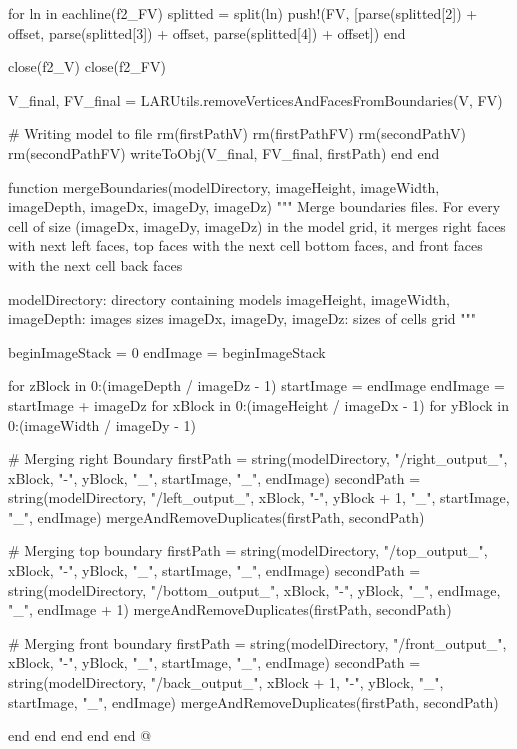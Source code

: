 \documentclass[11pt,oneside]{article}	%
\begin{document}
{    for ln in eachline(f2_FV)
      splitted = split(ln)
      push!(FV, [parse(splitted[2]) + offset, parse(splitted[3]) + offset, parse(splitted[4]) + offset])
    end

    close(f2_V)
    close(f2_FV)
    
    V_final, FV_final = LARUtils.removeVerticesAndFacesFromBoundaries(V, FV)
    
    # Writing model to file
    rm(firstPathV)
    rm(firstPathFV)
    rm(secondPathV)
    rm(secondPathFV)
    writeToObj(V_final, FV_final, firstPath)
  end  
end

function mergeBoundaries(modelDirectory,
                         imageHeight, imageWidth, imageDepth,
                         imageDx, imageDy, imageDz)
  """
  Merge boundaries files. For every cell of size
  (imageDx, imageDy, imageDz) in the model grid,
  it merges right faces with next left faces, top faces
  with the next cell bottom faces, and front faces
  with the next cell back faces

  modelDirectory: directory containing models
  imageHeight, imageWidth, imageDepth: images sizes
  imageDx, imageDy, imageDz: sizes of cells grid
  """

  beginImageStack = 0
  endImage = beginImageStack

  for zBlock in 0:(imageDepth / imageDz - 1)
    startImage = endImage
    endImage = startImage + imageDz
    for xBlock in 0:(imageHeight / imageDx - 1)
      for yBlock in 0:(imageWidth / imageDy - 1)

        # Merging right Boundary
        firstPath = string(modelDirectory, "/right_output_", xBlock, "-", yBlock, "_", startImage, "_", endImage)
        secondPath = string(modelDirectory, "/left_output_", xBlock, "-", yBlock + 1, "_", startImage, "_", endImage)
        mergeAndRemoveDuplicates(firstPath, secondPath)

        # Merging top boundary
        firstPath = string(modelDirectory, "/top_output_", xBlock, "-", yBlock, "_", startImage, "_", endImage)
        secondPath = string(modelDirectory, "/bottom_output_", xBlock, "-", yBlock, "_", endImage, "_", endImage + 1)
        mergeAndRemoveDuplicates(firstPath, secondPath)

        # Merging front boundary
        firstPath = string(modelDirectory, "/front_output_", xBlock, "-", yBlock, "_", startImage, "_", endImage)
        secondPath = string(modelDirectory, "/back_output_", xBlock + 1, "-", yBlock, "_", startImage, "_", endImage)
        mergeAndRemoveDuplicates(firstPath, secondPath)

      end
    end
  end
end
end
@}
\end{document}
